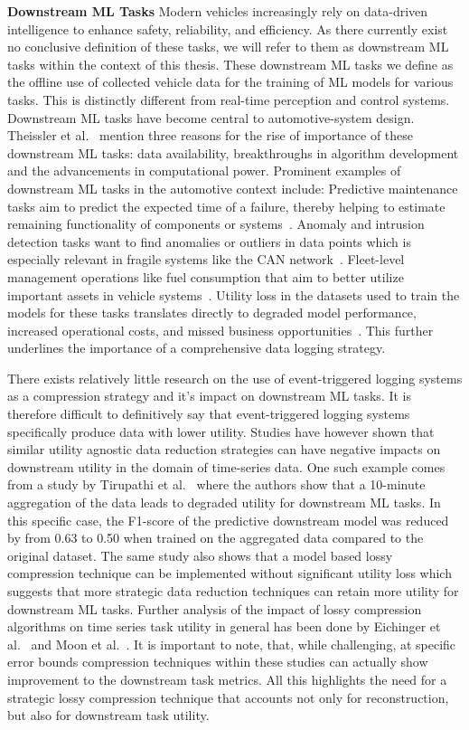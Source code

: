 \textbf{Downstream ML Tasks} Modern vehicles increasingly rely on data-driven intelligence to enhance safety, reliability, and efficiency. As there currently exist no conclusive definition of these tasks, we will refer to them as downstream ML tasks within the context of this thesis. These downstream ML tasks we define as the offline use of collected vehicle data for the training of ML models for various tasks. This is distinctly different from real-time perception and control systems. Downstream ML tasks have become central to automotive-system design. Theissler et al.~\cite[p.~2]{Theissler2021} mention three reasons for the rise of importance of these downstream ML tasks: data availability, breakthroughs in algorithm development and the advancements in computational power. Prominent examples of downstream ML tasks in the automotive context include: Predictive maintenance tasks aim to predict the expected time of a failure, thereby helping to estimate remaining functionality of components or systems~\cite[p.~3]{Theissler2021}. Anomaly and intrusion detection tasks want to find anomalies or outliers in data points which is especially relevant in fragile systems like the CAN network~\cite[pp.~1--3]{Oezdemir2024}. Fleet-level management operations like fuel consumption that aim to better utilize important assets in vehicle systems~\cite[pp.~1--2]{Brunheroto2022}. Utility loss in the datasets used to train the models for these tasks translates directly to degraded model performance, increased operational costs, and missed business opportunities~\cite[pp.~4--5]{Komorkiewicz2023}. This further underlines the importance of a comprehensive data logging strategy.

There exists relatively little research on the use of event-triggered logging systems as a compression strategy and it's impact on downstream ML tasks. It is therefore difficult to definitively say that event-triggered logging systems specifically produce data with lower utility. Studies have however shown that similar utility agnostic data reduction strategies can have negative impacts on downstream utility in the domain of time-series data. One such example comes from a study by Tirupathi et al.~\cite{Tirupathi2022} where the authors show that a 10-minute aggregation of the data leads to degraded utility for downstream ML tasks. In this specific case, the F1-score of the predictive downstream model was reduced by from 0.63 to 0.50 when trained on the aggregated data compared to the original dataset. The same study also shows that a model based lossy compression technique can be implemented without significant utility loss which suggests that more strategic data reduction techniques can retain more utility for downstream ML tasks. Further analysis of the impact of lossy compression algorithms on time series task utility in general has been done by Eichinger et al.~\cite{Eichinger2015} and Moon et al.~\cite{Moon2018}. It is important to note, that, while challenging, at specific error bounds compression techniques within these studies can actually show improvement to the downstream task metrics. All this highlights the need for a strategic lossy compression technique that accounts not only for reconstruction, but also for downstream task utility. 

